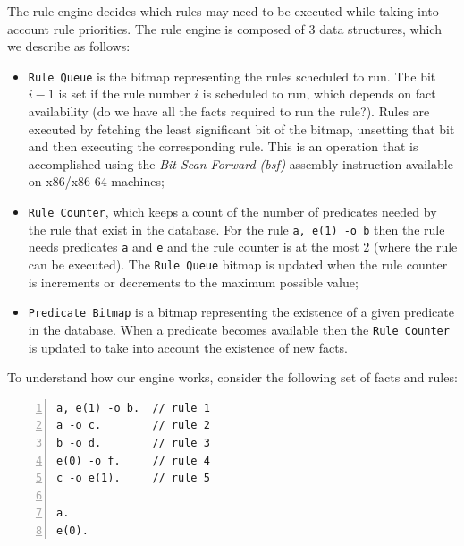 The rule engine decides which rules may need to be executed while taking into
account rule priorities. The rule engine is composed of 3 data structures, which
we describe as follows:

\begin{itemize}

   \item \texttt{Rule Queue} is the bitmap representing the rules scheduled to
      run. The bit $i-1$ is set if the rule number $i$ is scheduled to run,
      which depends on fact availability (do we have all the facts required to
      run the rule?). Rules are executed by fetching the least significant bit
      of the bitmap, unsetting that bit and then executing the corresponding
      rule. This is an operation that is accomplished using the \emph{Bit Scan
      Forward (bsf)} assembly instruction available on x86/x86-64 machines;

   \item \texttt{Rule Counter}, which keeps a count of the number of predicates
      needed by the rule that exist in the database. For the rule \texttt{a,
      e(1) -o b} then the rule needs predicates \texttt{a} and \texttt{e} and
      the rule counter is at the most 2 (where the rule can be executed). The
      \texttt{Rule Queue} bitmap is updated when the rule counter is increments
      or decrements to the maximum possible value;

   \item \texttt{Predicate Bitmap} is a bitmap representing the existence of a
      given predicate in the database. When a predicate becomes available then
      the \texttt{Rule Counter} is updated to take into account the existence of
      new facts.

\end{itemize}

To understand how our engine works, consider the following set of facts and
rules:

\begin{Verbatim}[numbers=left,fontsize=\codesize]
a, e(1) -o b.  // rule 1
a -o c.        // rule 2
b -o d.        // rule 3
e(0) -o f.     // rule 4
c -o e(1).     // rule 5

a.
e(0).
\end{Verbatim}

